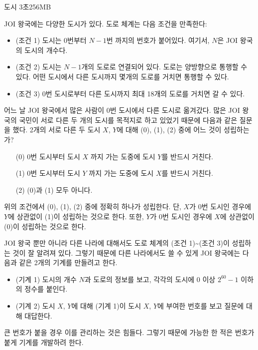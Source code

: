 \begin{problem}{도시}
	{}{}
	{3초}{256MB}{}
	
	JOI 왕국에는 다양한 도시가 있다. 도로 체계는 다음 조건을 만족한다:
	
	\begin{itemize}
		\item (조건 1) 도시는 0번부터 $N-1$번 까지의 번호가 붙어있다. 여기서, $N$은 JOI 왕국의 도시의 개수다.
		\item (조건 2) 도시는 $N-1$개의 도로로 연결되어 있다. 도로는 양방향으로 통행할 수 있다. 어떤 도시에서 다른 도시까지 몇개의 도로를 거치면 통행할 수 있다.
		\item (조건 3) 0번 도시로부터 다른 도시까지 최대 18개의 도로를 거치면 갈 수 있다.
	\end{itemize}

	어느 날 JOI 왕국에서 많은 사람이 0번 도시에서 다른 도시로 옮겨갔다. 많은 JOI 왕국의 국민이 서로 다른 두 개의 도시를 목적지로 하고 있었기 때문에 다음과 같은 질문을 했다. 2개의 서로 다른 두 도시 $X$, $Y$에 대해 (0), (1), (2) 중에 어느 것이 성립하는가?
	
	\begin{enumerate}
		\item [(0)] 0번 도시부터 도시 $X$ 까지 가는 도중에 도시 $Y$를 반드시 거친다.
		\item [(1)] 0번 도시부터 도시 $Y$ 까지 가는 도중에 도시 $X$를 반드시 거친다.
		\item [(2)] (0)과 (1) 모두 아니다.
	\end{enumerate}

	위의 조건에서 (0), (1), (2) 중에 정확히 하나가 성립한다. 단, $X$가 0번 도시인 경우에 $Y$에 상관없이 (1)이 성립하는 것으로 한다. 또한, $Y$가 0번 도시인 경우에 $X$에 상관없이 (0)이 성립하는 것으로 한다.
	
	JOI 왕국 뿐만 아니라 다른 나라에 대해서도 도로 체계의 (조건 1)\textasciitilde (조건 3)이 성립하는 것이 잘 알려져 있다. 그렇기 때문에 다른 나라에서도 쓸 수 있게 JOI 왕국에는 다음과 같은 2개의 기계를 만들려고 한다.
	
	\begin{itemize}
		\item (기계 1) 도시의 개수 $N$과 도로의 정보를 보고, 각각의 도시에 0 이상 $2^{60}-1$ 이하의 정수를 붙인다.
		\item (기계 2) 도시 $X$, $Y$에 대해 (기계 1)이 도시 $X$, $Y$에 부여한 번호를 보고 질문에 대해 대답한다.
	\end{itemize}
	
	큰 번호가 붙을 경우 이를 관리하는 것은 힘들다. 그렇기 때문에 가능한 한 적은 번호가 붙게 기계를 개발하려 한다.
	

\end{problem}
